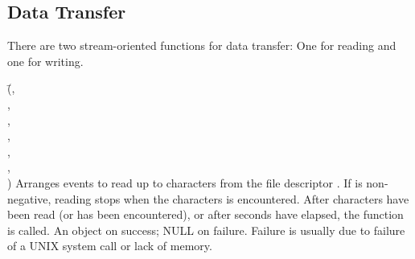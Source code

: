\documentclass{article}
\begin{document}
\subsection{Data Transfer}

There are two stream-oriented functions for data transfer:  One for
reading and one for writing.

{(\=,\\
  \> ,\\
  \> ,\\
  \> ,\\
  \> ,\\
  \> ,\\
  \>)}
{Arranges events to read up to  characters from the file
  descriptor .  If  is non-negative, reading stops
  when the characters  is encountered.  After 
  characters have been read (or  has been encountered), or
  after  seconds have elapsed, the function  is
  called.}
{An  object on success; NULL on failure.  Failure
  is usually due to failure of a UNIX system call or lack of memory.}
\end{document}
